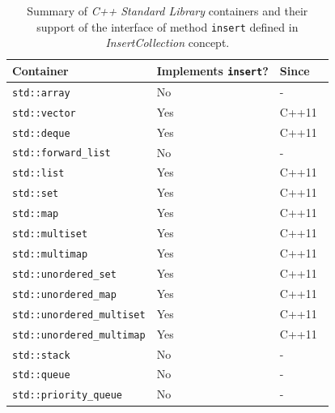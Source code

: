 \documentclass[thesis=B,english]{FITthesis}[2019/03/21]
\begin{document}
\begin{table}[h]
\centering
\begin{tabular}{|l|l|l|}
\hline
\textbf{Container} & \textbf{Implements \texttt{insert}?} & \textbf{Since} \\ \hline
\texttt{std::array} & \cellcolor[HTML]{FF8E8A}No & - \\
\texttt{std::vector} & \cellcolor[HTML]{9AFF99}Yes & C++11~\cite{std_vector} \\
\texttt{std::deque} & \cellcolor[HTML]{9AFF99}Yes & C++11~\cite{std_deque} \\
\texttt{std::forward\_list} & \cellcolor[HTML]{FF8E8A}No & - \\
\texttt{std::list} & \cellcolor[HTML]{9AFF99}Yes & C++11~\cite{std_list} \\
\texttt{std::set} & \cellcolor[HTML]{9AFF99}Yes & C++11~\cite{std_set} \\
\texttt{std::map} & \cellcolor[HTML]{9AFF99}Yes & C++11~\cite{std_map} \\
\texttt{std::multiset} & \cellcolor[HTML]{9AFF99}Yes & C++11~\cite{std_multiset} \\
\texttt{std::multimap} & \cellcolor[HTML]{9AFF99}Yes & C++11~\cite{std_multimap} \\
\texttt{std::unordered\_set} & \cellcolor[HTML]{9AFF99}Yes & C++11~\cite{std_unordered_set} \\
\texttt{std::unordered\_map} & \cellcolor[HTML]{9AFF99}Yes & C++11~\cite{std_unordered_map} \\
\texttt{std::unordered\_multiset} & \cellcolor[HTML]{9AFF99}Yes & C++11~\cite{std_unordered_multiset} \\
\texttt{std::unordered\_multimap} & \cellcolor[HTML]{9AFF99}Yes & C++11~\cite{std_unordered_multimap} \\
\texttt{std::stack} & \cellcolor[HTML]{FF8E8A}No & - \\
\texttt{std::queue} & \cellcolor[HTML]{FF8E8A}No & - \\
\texttt{std::priority\_queue} & \cellcolor[HTML]{FF8E8A}No & - \\ \hline
\end{tabular}
\caption[Summary of \emph{C++ Standard Library} containers and their support of the interface of method \texttt{insert} defined in \emph{InsertCollection} concept]{Summary of \emph{C++ Standard Library} containers and their support of the interface of method \texttt{insert} defined in \emph{InsertCollection} concept.}
\label{tab:insert_containers}
\end{table}
\end{document}
